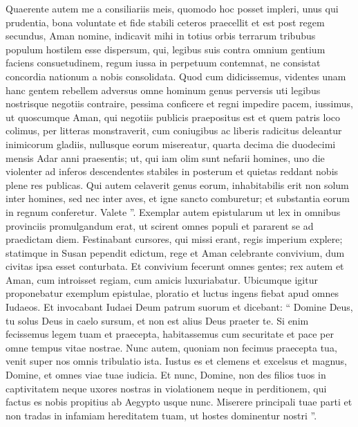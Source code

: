 \begin{biblechapter}
\begin{biblechapter}
\begin{biblechapter}
\versec Quaerente autem me a consiliariis meis, quomodo hoc posset impleri, unus qui prudentia, bona voluntate et fide stabili ceteros praecellit et est post regem secundus, Aman nomine, 
\versed indicavit mihi in totius orbis terrarum tribubus populum hostilem esse dispersum, qui, legibus suis contra omnium gentium faciens consuetudinem, regum iussa in perpetuum contemnat, ne consistat concordia nationum a nobis consolidata. 
\versee Quod cum didicissemus, videntes unam hanc gentem rebellem adversus omne hominum genus perversis uti legibus nostrisque negotiis contraire, pessima conficere et regni impedire pacem, 
\versef iussimus, ut quoscumque Aman, qui negotiis publicis praepositus est et quem patris loco colimus, per litteras monstraverit, cum coniugibus ac liberis radicitus deleantur inimicorum gladiis, nullusque eorum misereatur, quarta decima die duodecimi mensis Adar anni praesentis; 
\verseg ut, qui iam olim sunt nefarii homines, uno die violenter ad inferos descendentes stabiles in posterum et quietas reddant nobis plene res publicas. \verseh Qui autem celaverit genus eorum, inhabitabilis erit non solum inter homines, sed nec inter aves, et igne sancto comburetur; et substantia eorum in regnum conferetur. Valete ”.
 \verse Exemplar autem epistularum ut lex in omnibus provinciis promulgandum erat, ut scirent omnes populi et pararent se ad praedictam diem. 
\verse Festinabant cursores, qui missi erant, regis imperium explere; statimque in Susan pependit edictum, rege et Aman celebrante convivium, dum civitas ipsa esset conturbata. 
 \versea Et convivium fecerunt omnes gentes; rex autem et Aman, cum introisset regiam, cum amicis luxuriabatur. 
\verseb Ubicumque igitur proponebatur exemplum epistulae, ploratio et luctus ingens fiebat apud omnes Iudaeos. 
\versec Et invocabant Iudaei Deum patrum suorum et dicebant:
 \versed “ Domine Deus, tu solus Deus in caelo sursum,
 et non est alius Deus praeter te.
 \versee Si enim fecissemus legem tuam et praecepta,
 habitassemus cum securitate et pace per omne tempus vitae nostrae.
 \versef Nunc autem, quoniam non fecimus praecepta tua,
 venit super nos omnis tribulatio ista.
 \verseg Iustus es et clemens et excelsus et magnus, Domine,
 et omnes viae tuae iudicia.
 \verseh Et nunc, Domine, non des filios tuos in captivitatem
 neque uxores nostras in violationem neque in perditionem,
 qui factus es nobis propitius ab Aegypto usque nunc.
 \versei Miserere principali tuae parti
 et non tradas in infamiam hereditatem tuam,
 ut hostes dominentur nostri ”.
 

\end{biblechapter}
\end{biblechapter}
\end{biblechapter}
